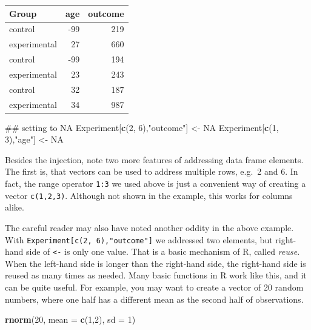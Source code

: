 \documentclass[]{svmono}
\newenvironment{Shaded}{\begin{snugshade}}{\end{snugshade}}
\newcommand{\KeywordTok}[1]{\textcolor[rgb]{0.13,0.29,0.53}{\textbf{#1}}}
\newcommand{\DataTypeTok}[1]{\textcolor[rgb]{0.13,0.29,0.53}{#1}}
\newcommand{\DecValTok}[1]{\textcolor[rgb]{0.00,0.00,0.81}{#1}}
\newcommand{\StringTok}[1]{\textcolor[rgb]{0.31,0.60,0.02}{#1}}
\newcommand{\OtherTok}[1]{\textcolor[rgb]{0.56,0.35,0.01}{#1}}
\newcommand{\NormalTok}[1]{#1}
\begin{document}
\begin{tabular}{l|r|r}
\hline
Group & age & outcome\\
\hline
control & -99 & 219\\
\hline
experimental & 27 & 660\\
\hline
control & -99 & 194\\
\hline
experimental & 23 & 243\\
\hline
control & 32 & 187\\
\hline
experimental & 34 & 987\\
\hline
\end{tabular}

\begin{Shaded}
\begin{Highlighting}[]
\NormalTok{## setting to NA}
\NormalTok{Experiment[}\KeywordTok{c}\NormalTok{(}\DecValTok{2}\NormalTok{, }\DecValTok{6}\NormalTok{),}\StringTok{"outcome"}\NormalTok{] <-}\StringTok{ }\OtherTok{NA}
\NormalTok{Experiment[}\KeywordTok{c}\NormalTok{(}\DecValTok{1}\NormalTok{, }\DecValTok{3}\NormalTok{),}\StringTok{"age"}\NormalTok{]     <-}\StringTok{ }\OtherTok{NA}
\end{Highlighting}
\end{Shaded}

Besides the injection, note two more features of addressing data frame
elements. The first is, that vectors can be used to address multiple
rows, e.g.~2 and 6. In fact, the range operator \texttt{1:3} we used
above is just a convenient way of creating a vector \texttt{c(1,2,3)}.
Although not shown in the example, this works for columns alike.

The careful reader may also have noted another oddity in the above
example. With \texttt{Experiment{[}c(2,\ 6),"outcome"{]}} we addressed
two elements, but right-hand side of \texttt{\textless{}-} is only one
value. That is a basic mechanism of R, called \emph{reuse}. When the
left-hand side is longer than the right-hand side, the right-hand side
is reused as many times as needed. Many basic functions in R work like
this, and it can be quite useful. For example, you may want to create a
vector of 20 random numbers, where one half has a different mean as the
second half of observations.

\begin{Shaded}
\begin{Highlighting}[]
\KeywordTok{rnorm}\NormalTok{(}\DecValTok{20}\NormalTok{, }\DataTypeTok{mean =} \KeywordTok{c}\NormalTok{(}\DecValTok{1}\NormalTok{,}\DecValTok{2}\NormalTok{), }\DataTypeTok{sd =} \DecValTok{1}\NormalTok{)}
\end{Highlighting}
\end{Shaded}
\end{document}
